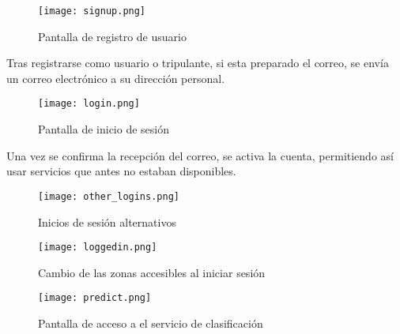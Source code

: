 \begin{figure}
	\centering
	\texttt{[image: signup.png]}
	\caption{Pantalla de registro de usuario}\label{fig:signup.png}
\end{figure}

Tras registrarse como usuario o tripulante, si esta preparado el correo, se envía un correo electrónico a su dirección personal.

\begin{figure}
	\centering
	\texttt{[image: login.png]}
	\caption{Pantalla de inicio de sesión}\label{fig:login.png}
\end{figure}

Una vez se confirma la recepción del correo, se activa la cuenta, permitiendo así usar servicios que antes no estaban disponibles.

\begin{figure}
	\centering
	\texttt{[image: other\_logins.png]}
	\caption{Inicios de sesión alternativos}\label{fig:other_logins.png}
\end{figure}


\begin{figure}
	\centering
	\texttt{[image: loggedin.png]}
	\caption{Cambio de las zonas accesibles al iniciar sesión}\label{fig:loggedin.png}
\end{figure}


\begin{figure}
	\centering
	\texttt{[image: predict.png]}
	\caption{Pantalla de acceso a el servicio de clasificación}\label{fig:predict.png}
\end{figure}






